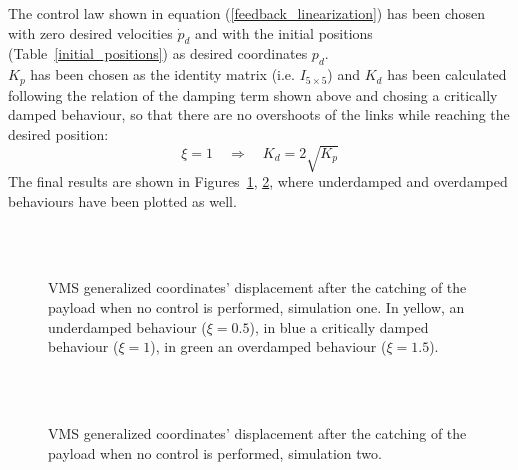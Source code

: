 \documentclass[a4paper,12pt,oneside]{report}
\begin{document}
The control law shown in equation (\ref{feedback_linearization}) has been chosen with zero desired velocities $\dot{p}_d$ and with the initial positions (Table~\ref{initial_positions}) as desired coordinates $p_d$.\\
$K_p$ has been chosen as the identity matrix (i.e. $I_{5\times 5}$) and $K_d$ has been calculated following the relation of the damping term shown above and chosing a critically damped behaviour, so that there are no overshoots of the links while reaching the desired position:
\begin{equation}
  \xi=1 \quad \Rightarrow \quad K_d=2\sqrt{K_p}
  \label{critically_damped}
\end{equation}
The final results are shown in Figures~\ref{controlled_motion_1}, \ref{controlled_motion_2}, where underdamped and overdamped behaviours have been plotted as well.
\begin{figure}
  \centering
  \subfloat
  {}\quad
\subfloat
  {} \\
  \subfloat
  {}\quad
  \subfloat
  {
  \label{q1_real}}\\
  \subfloat
  {}
  \caption{VMS generalized coordinates' displacement after the catching of the payload when no control is performed, simulation one. In yellow, an underdamped behaviour ($\xi=0.5$), in blue a critically damped behaviour ($\xi=1$), in green an overdamped behaviour ($\xi=1.5$).}
  \label{controlled_motion_1}
\end{figure}
\begin{figure}
  \centering
  \subfloat
  {}\quad
\subfloat
  {} \\
  \subfloat
  {}\quad
  \subfloat
  {}\\
  \subfloat
  {}
  \caption{VMS generalized coordinates' displacement after the catching of the payload when no control is performed, simulation two.}
  \label{controlled_motion_2}
\end{figure}
\newpage
\end{document}
